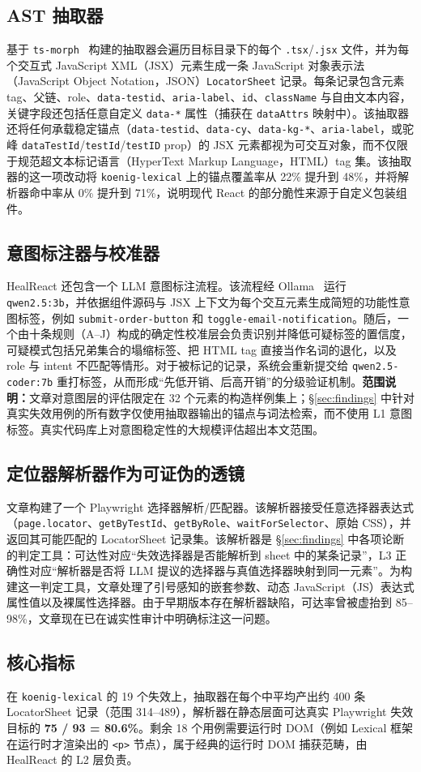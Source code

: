 \subsection{AST 抽取器}
基于 \texttt{ts-morph}~\cite{tsmorph} 构建的抽取器会遍历目标目录下的每个 \texttt{.tsx}/\texttt{.jsx} 文件，并为每个交互式 JavaScript XML（JSX）元素生成一条 JavaScript 对象表示法（JavaScript Object Notation，JSON）\texttt{LocatorSheet} 记录。每条记录包含元素 tag、父链、role、\texttt{data-testid}、\texttt{aria-label}、\texttt{id}、\texttt{className} 与自由文本内容，关键字段还包括任意自定义 \texttt{data-*} 属性（捕获在 \texttt{dataAttrs} 映射中）。该抽取器还将任何承载稳定锚点（\texttt{data-testid}、\texttt{data-cy}、\texttt{data-kg-*}、\texttt{aria-label}，或驼峰 \texttt{dataTestId}/\texttt{testId}/\texttt{testID} prop）的 JSX 元素都视为可交互对象，而不仅限于规范超文本标记语言（HyperText Markup Language，HTML）tag 集。该抽取器的这一项改动将 \texttt{koenig-lexical} 上的锚点覆盖率从 22\% 提升到 48\%，并将解析器命中率从 0\% 提升到 71\%，说明现代 React 的部分脆性来源于自定义包装组件。

\subsection{意图标注器与校准器}
HealReact 还包含一个 LLM 意图标注流程。该流程经 Ollama~\cite{ollama} 运行 \texttt{qwen2.5:3b}，并依据组件源码与 JSX 上下文为每个交互元素生成简短的功能性意图标签，例如 \texttt{submit-order-button} 和 \texttt{toggle-email-notification}。随后，一个由十条规则（A--J）构成的确定性校准层会负责识别并降低可疑标签的置信度，可疑模式包括兄弟集合的塌缩标签、把 HTML tag 直接当作名词的退化，以及 role 与 intent 不匹配等情形。对于被标记的记录，系统会重新提交给 \texttt{qwen2.5-coder:7b} 重打标签，从而形成“先低开销、后高开销”的分级验证机制。\textbf{范围说明：}文章对意图层的评估限定在 32 个元素的构造样例集上；\S\ref{sec:findings} 中针对真实失效用例的所有数字仅使用抽取器输出的锚点与词法检索，而不使用 L1 意图标签。真实代码库上对意图稳定性的大规模评估超出本文范围。

\subsection{定位器解析器作为可证伪的透镜}
文章构建了一个 Playwright 选择器解析/匹配器。该解析器接受任意选择器表达式（\texttt{page.locator}、\texttt{getByTestId}、\texttt{getByRole}、\texttt{waitForSelector}、原始 CSS），并返回其可能匹配的 LocatorSheet 记录集。该解析器是 \S\ref{sec:findings} 中各项论断的判定工具：可达性对应“失效选择器是否能解析到 sheet 中的某条记录”，L3 正确性对应“解析器是否将 LLM 提议的选择器与真值选择器映射到同一元素”。为构建这一判定工具，文章处理了引号感知的嵌套参数、动态 JavaScript（JS）表达式属性值以及裸属性选择器。由于早期版本存在解析器缺陷，可达率曾被虚抬到 85--98\%，文章现在已在诚实性审计中明确标注这一问题。

\subsection{核心指标}
在 \texttt{koenig-lexical} 的 19 个失效上，抽取器在每个中平均产出约 400 条 LocatorSheet 记录（范围 314--489），解析器在静态层面可达真实 Playwright 失效目标的 \textbf{75 / 93 = 80.6\%}。剩余 18 个用例需要运行时 DOM（例如 Lexical 框架在运行时才渲染出的 \texttt{<p>} 节点），属于经典的运行时 DOM 捕获范畴，由 HealReact 的 L2 层负责。
